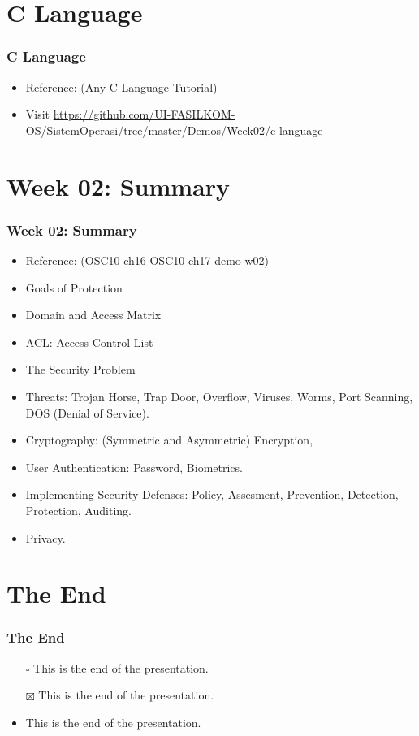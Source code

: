 \documentclass[aspectratio=169, xcolor=table, notheorems, hyperref={pdfpagelabels=false}]{beamer}
\begin{document}
\section{C Language}
\begin{frame}
\frametitle{C Language}
\begin{itemize}
\item Reference: (Any C Language Tutorial)
\item Visit
\url{https://github.com/UI-FASILKOM-OS/SistemOperasi/tree/master/Demos/Week02/c-language}
\end{itemize}
\end{frame}

\section{Week 02: Summary}
\begin{frame}
\frametitle{Week 02: Summary}
\begin{itemize}
\item Reference: (OSC10-ch16 OSC10-ch17 demo-w02)
\item Goals of Protection
\item Domain and Access Matrix
\item ACL: Access Control List
\item The Security Problem
\item Threats: Trojan Horse, Trap Door, Overflow, Viruses, Worms, Port Scanning, 
      DOS (Denial of Service).
\item Cryptography: (Symmetric and Asymmetric) Encryption,
\item User Authentication: Password, Biometrics.
\item Implementing Security Defenses: Policy, Assesment, Prevention, Detection, Protection, Auditing.
\item Privacy.
\end{itemize}
\end{frame}

\section{The End}
\begin{frame}
\frametitle{The End}
\begin{itemize}
\item[$\square$] This is the end of the presentation.
\item[$\boxtimes$] This is the end of the presentation.
\item This is the end of the presentation.
\end{itemize}
\end{frame}

\end{document}
